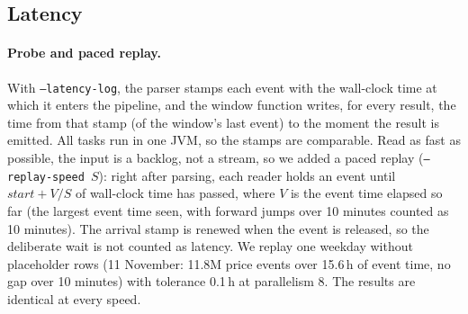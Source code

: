 
\subsection{Latency}\label{sec:latency}
\paragraph{Probe and paced replay.} With \texttt{--latency-log}, the parser
stamps each event with the wall-clock time at which it enters the pipeline, and
the window function writes, for every result, the time from that stamp (of the
window's last event) to the moment the result is emitted. All tasks run in one
JVM, so the stamps are comparable. Read as fast as possible, the input is a
backlog, not a stream, so we added a paced replay
(\texttt{--replay-speed}~$S$): right after parsing, each reader holds an event
until $\textit{start} + V/S$ of wall-clock time has passed, where $V$ is the
event time elapsed so far (the largest event time seen, with forward jumps over
10 minutes counted as 10 minutes). The arrival stamp is renewed when the event
is released, so the deliberate wait is not counted as latency. We replay one
weekday without placeholder rows (11 November: 11.8M price events over
15.6\,h of event time, no gap over 10 minutes) with tolerance 0.1\,h at
parallelism 8. The results are identical at every speed.

